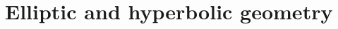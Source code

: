 \documentclass[../geometry_main.tex]{subfiles}
\begin{document}
\chapter{Elliptic and hyperbolic geometry}
\label{sec:elliptic_hyperbolic}
\end{document}
